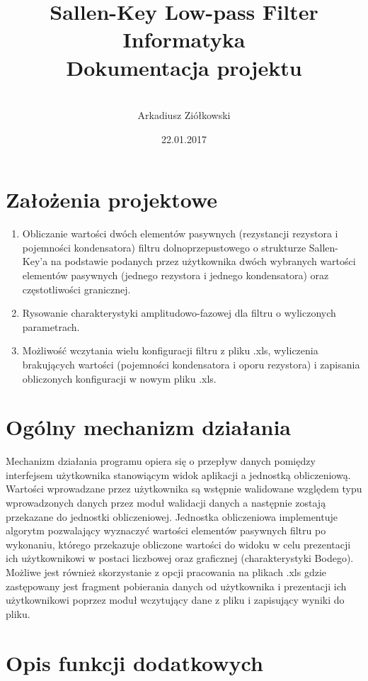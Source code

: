\documentclass[a4paper,12pt]{article}
\title{\Huge \textbf{Sallen-Key Low-pass Filter\\[0.3in]} 
  \huge Informatyka \\[0.2in]
  \LARGE Dokumentacja projektu
}
\date{22.01.2017}
\author{
 	\quad	\\
  Arkadiusz Ziółkowski\\
}
\begin{document}
\maketitle
\pagebreak

\tableofcontents
\pagebreak


\section{Założenia projektowe}

	\begin{enumerate}
		\item Obliczanie wartości dwóch elementów pasywnych (rezystancji rezystora i 
		pojemności kondensatora) filtru dolnoprzepustowego o strukturze Sallen-Key'a
		na podstawie podanych przez użytkownika dwóch wybranych wartości elementów 
		pasywnych (jednego rezystora i jednego kondensatora) oraz częstotliwości
		granicznej.
		\item Rysowanie charakterystyki amplitudowo-fazowej dla filtru o wyliczonych
		 parametrach.
		\item Możliwość wczytania wielu konfiguracji filtru z pliku .xls, wyliczenia 
		brakujących wartości (pojemności kondensatora i oporu rezystora) i zapisania
		obliczonych konfiguracji w nowym pliku .xls.
	\end{enumerate}

\section{Ogólny mechanizm działania}

	Mechanizm działania programu opiera się o przepływ danych pomiędzy interfejsem
	użytkownika stanowiącym widok aplikacji a jednostką obliczeniową. 
	Wartości wprowadzane przez użytkownika są wstępnie walidowane względem typu
	wprowadzonych danych przez moduł walidacji danych a następnie zostają przekazane
	do jednostki obliczeniowej.
	Jednostka obliczeniowa implementuje algorytm pozwalający
	wyznaczyć wartości elementów pasywnych filtru po wykonaniu, którego przekazuje
	obliczone wartości do widoku w celu prezentacji ich użytkownikowi w postaci liczbowej
	oraz graficznej (charakterystyki Bodego). \\
	Możliwe jest również skorzystanie z opcji pracowania na plikach .xls gdzie zastępowany 
	jest fragment pobierania danych od użytkownika i prezentacji ich użytkownikowi  poprzez
	moduł wczytujący dane z pliku i zapisujący wyniki do pliku.

\section{Opis funkcji dodatkowych}
\end{document}
